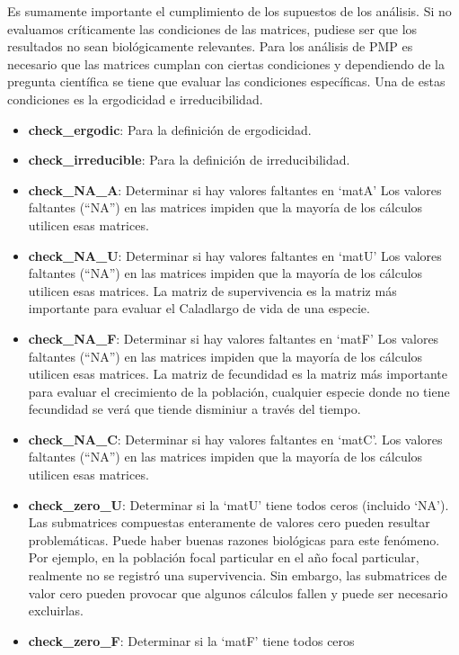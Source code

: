 \documentclass[
  12pt,
  letterpaper,
]{book}
\begin{document}
Es sumamente importante el cumplimiento de los supuestos de los
análisis. Si no evaluamos críticamente las condiciones de las matrices,
pudiese ser que los resultados no sean biológicamente relevantes. Para
los análisis de PMP es necesario que las matrices cumplan con ciertas
condiciones y dependiendo de la pregunta científica se tiene que evaluar
las condiciones específicas. Una de estas condiciones es la ergodicidad
e irreducibilidad.

\begin{itemize}
\item
  \textbf{check\_ergodic}: Para la definición de ergodicidad.
\item
  \textbf{check\_irreducible}: Para la definición de irreducibilidad.
\item
  \textbf{check\_NA\_A}: Determinar si hay valores faltantes en `matA'
  Los valores faltantes (``NA'') en las matrices impiden que la mayoría
  de los cálculos utilicen esas matrices.
\item
  \textbf{check\_NA\_U}: Determinar si hay valores faltantes en `matU'
  Los valores faltantes (``NA'') en las matrices impiden que la mayoría
  de los cálculos utilicen esas matrices. La matriz de supervivencia es
  la matriz más importante para evaluar el Caladlargo de vida de una
  especie.
\item
  \textbf{check\_NA\_F}: Determinar si hay valores faltantes en `matF'
  Los valores faltantes (``NA'') en las matrices impiden que la mayoría
  de los cálculos utilicen esas matrices. La matriz de fecundidad es la
  matriz más importante para evaluar el crecimiento de la población,
  cualquier especie donde no tiene fecundidad se verá que tiende
  disminiur a través del tiempo.
\item
  \textbf{check\_NA\_C}: Determinar si hay valores faltantes en `matC'.
  Los valores faltantes (``NA'') en las matrices impiden que la mayoría
  de los cálculos utilicen esas matrices.
\item
  \textbf{check\_zero\_U}: Determinar si la `matU' tiene todos ceros
  (incluido `NA'). Las submatrices compuestas enteramente de valores
  cero pueden resultar problemáticas. Puede haber buenas razones
  biológicas para este fenómeno. Por ejemplo, en la población focal
  particular en el año focal particular, realmente no se registró una
  supervivencia. Sin embargo, las submatrices de valor cero pueden
  provocar que algunos cálculos fallen y puede ser necesario excluirlas.
\item
  \textbf{check\_zero\_F}: Determinar si la `matF' tiene todos ceros

\end{itemize}
\end{document}
